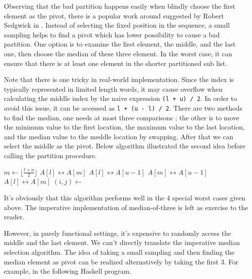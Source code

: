 \documentclass[b5paper]{article}
\begin{document}
Observing that the bad partition happens easily when blindly choose the first element as the pivot,
there is a popular work around suggested by Robert Sedgwick in \cite{qsort-impl}. Instead of
selecting the fixed position in the sequence, a small sampling helps to find a pivot which
has lower possibility to cause a bad partition. One option is to examine the first element, the
middle, and the last one, then choose the median of these three element. In the worst case,
it can ensure that there is at least one element in the shorter partitioned sub list.

Note that there is one tricky in real-world implementation. Since the index is typically represented
in limited length words, it may cause overflow when calculating the middle index by
the naive expression \texttt{(l + u) / 2}. In order to avoid this issue, it can be accessed
as \texttt{l + (u - l) / 2}. There are two methods to find the median, one needs at most three
comparisons \cite{3-way-part}; the other is to move the minimum value to the first location, the maximum value
to the last location, and the median value to the meddle location by swapping. After that
we can select the middle as the pivot.
Below algorithm illustrated the second idea before calling the partition procedure.

\begin{algorithmic}[1]
    \State $m \gets \lfloor \frac{l + u}{2} \rfloor$ 
     
      \State {} $A[l] \leftrightarrow A[m]$
    \EndIf
     
      \State {} $A[l] \leftrightarrow A[u-1]$
    \EndIf
     
      \State {} $A[m] \leftrightarrow A[u-1]$
    \EndIf
    \State {} $A[l] \leftrightarrow A[m]$
    \State $(i, j) \gets $ 
    \State {}
    \State {}
  \EndIf
\EndProcedure
\end{algorithmic}

It's obviously that this algorithm performs well in the 4 special worst cases given above.
The imperative implementation of median-of-three is left as exercise to the reader.

However, in purely functional settings, it's expensive to randomly access the middle and the last
element. We can't directly translate the imperative median selection algorithm. The idea of
taking a small sampling and then finding the median element as pivot can be realized alternatively
by taking the first 3. For example, in the following Haskell program.
\end{document}
